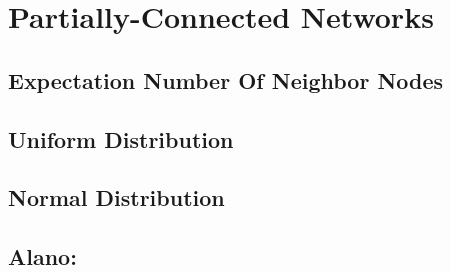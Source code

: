 \section{Partially-Connected Networks}
\label{PCN}




\subsection{Expectation Number Of Neighbor Nodes}


\subsection{Uniform Distribution}




\subsection{Normal Distribution}


\subsection{Alano: }







